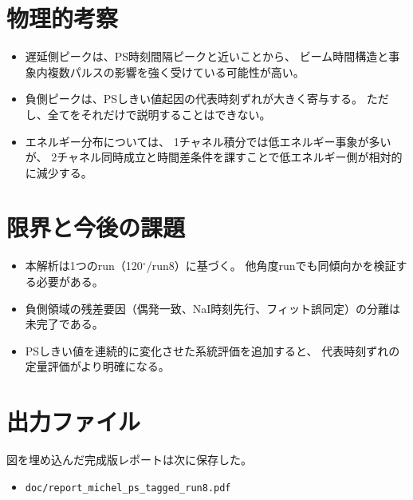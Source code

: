 \documentclass[a4paper,11pt]{jsarticle}
\begin{document}
\section{物理的考察}
\begin{itemize}
  \item 遅延側ピークは、PS時刻間隔ピークと近いことから、
  ビーム時間構造と事象内複数パルスの影響を強く受けている可能性が高い。
  \item 負側ピークは、PSしきい値起因の代表時刻ずれが大きく寄与する。
  ただし、全てをそれだけで説明することはできない。
  \item エネルギー分布については、
  1チャネル積分では低エネルギー事象が多いが、
  2チャネル同時成立と時間差条件を課すことで低エネルギー側が相対的に減少する。
\end{itemize}

\section{限界と今後の課題}
\begin{itemize}
  \item 本解析は1つのrun（120$^\circ$/run8）に基づく。
  他角度runでも同傾向かを検証する必要がある。
  \item 負側領域の残差要因（偶発一致、NaI時刻先行、フィット誤同定）の分離は未完了である。
  \item PSしきい値を連続的に変化させた系統評価を追加すると、
  代表時刻ずれの定量評価がより明確になる。
\end{itemize}

\section*{出力ファイル}
図を埋め込んだ完成版レポートは次に保存した。
\begin{itemize}
  \item \texttt{doc/report\_michel\_ps\_tagged\_run8.pdf}
\end{itemize}
\end{document}
